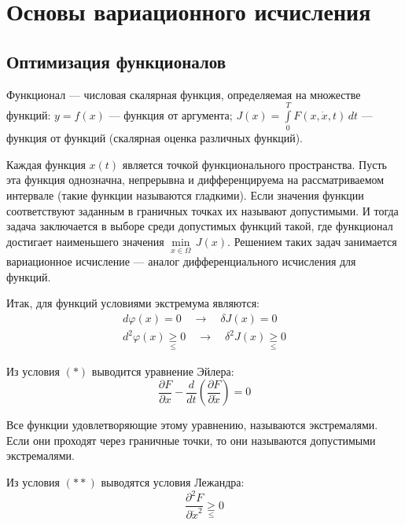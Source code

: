 \documentclass[preprint,russian,a5paper,10pt,twoside,mediummath]{ncc}
\begin{document}
\clearpage
\section{Основы вариационного исчисления\label{variations}}
	\subsection{Оптимизация функционалов\label{variations:general}}

Функционал --- числовая скалярная функция, определяемая на множестве функций: $ y = f(x) $ --- функция от аргумента; $ J(x) = \int\limits_0^T F \left( x, \dot{x}, t \right) \, dt $ --- функция от функций  (скалярная оценка различных функций).

Каждая функция $ x(t) $ является точкой функционального пространства. Пусть эта функция однозначна, непрерывна и дифференцируема на рассматриваемом интервале (такие функции называются гладкими). Если значения функции соответствуют заданным в граничных точках их называют допустимыми. И тогда задача заключается в выборе среди допустимых функций такой, где функционал достигает наименьшего значения $ \underset{ x \in \Omega }{ \min } \, J(x) $. Решением таких задач занимается вариационное исчисление --- аналог дифференциального исчисления для функций.

Итак, для функций условиями экстремума являются:
\begin{gather*}
d \varphi (x) = 0 \quad \to \quad \delta J(x) = 0 \tag{*} \\
d^2 \varphi (x) \underset{\le}{\ge} 0 \quad \to \quad \delta ^2 J(x) \underset{\le}{\ge} 0 \tag{**}
\end{gather*}

Из условия $(*)$ выводится уравнение Эйлера:
\begin{equation}\label{equ:variations:Euler}
\frac{\partial F}{\partial x} - \frac{d}{dt} \left( \frac{\partial F}{\partial \dot{x}} \right) = 0
\end{equation}

Все функции удовлетворяющие этому уравнению, называются экстремалями. Если они проходят через граничные точки, то они называются допустимыми экстремалями.

Из условия $(**)$ выводятся условия Лежандра:
\begin{equation}\label{equ:variations:Legendre}
\frac{\partial ^2 F}{\partial \dot{x} ^2} \underset{\le}{\ge} 0
\end{equation}

\pagebreak
\end{document}
